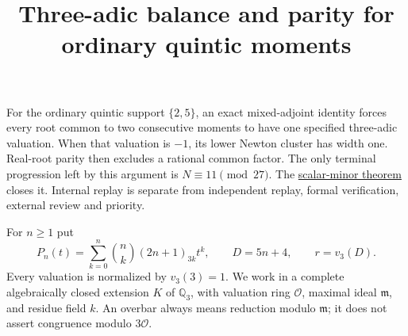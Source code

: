 \documentclass[11pt]{article}
\newcommand{\Q}{\mathbb Q}
\begin{document}
\setlength{\emergencystretch}{1em}
\title{Three-adic balance and parity for ordinary quintic moments}
\author{}\date{}\maketitle
For the ordinary quintic support $\{2,5\}$, an exact mixed-adjoint
identity forces every root common to two consecutive moments to have
one specified three-adic valuation. When that valuation is $-1$, its
lower Newton cluster has width one. Real-root parity then excludes a
rational common factor. The only terminal progression left by this
argument is $N\equiv11\pmod{27}$. The \href{QUINTIC_SCALAR_MINOR_SFC.tex}{scalar-minor theorem} closes it.
Internal replay is separate from independent replay, formal verification,
external review and priority.

For $n\ge1$ put
\[
 P_n(t)=\sum_{k=0}^n\binom nk(2n+1)_{3k}t^k,\qquad
 D=5n+4,\qquad r=v_3(D).
\]
Every valuation is normalized by $v_3(3)=1$.
We work in a complete algebraically closed extension $K$ of $\Q_3$,
with valuation ring $\mathcal O$, maximal ideal $\mathfrak m$, and residue
field $k$. An overbar always means reduction modulo $\mathfrak m$;
it does not assert congruence modulo $3\mathcal O$.
\end{document}
